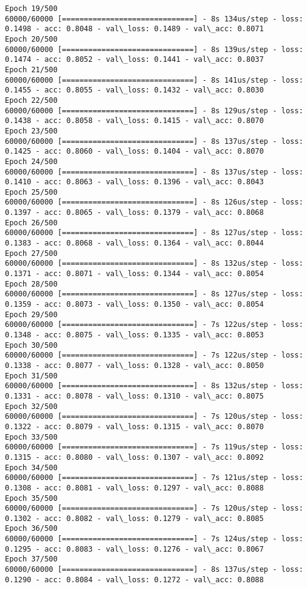 \documentclass[11pt]{article}
\begin{document}
\begin{Verbatim}[commandchars=\\\{\}]
Epoch 19/500
60000/60000 [==============================] - 8s 134us/step - loss: 0.1498 - acc: 0.8048 - val\_loss: 0.1489 - val\_acc: 0.8071
Epoch 20/500
60000/60000 [==============================] - 8s 139us/step - loss: 0.1474 - acc: 0.8052 - val\_loss: 0.1441 - val\_acc: 0.8037
Epoch 21/500
60000/60000 [==============================] - 8s 141us/step - loss: 0.1455 - acc: 0.8055 - val\_loss: 0.1432 - val\_acc: 0.8030
Epoch 22/500
60000/60000 [==============================] - 8s 129us/step - loss: 0.1438 - acc: 0.8058 - val\_loss: 0.1415 - val\_acc: 0.8070
Epoch 23/500
60000/60000 [==============================] - 8s 137us/step - loss: 0.1425 - acc: 0.8060 - val\_loss: 0.1404 - val\_acc: 0.8070
Epoch 24/500
60000/60000 [==============================] - 8s 137us/step - loss: 0.1410 - acc: 0.8063 - val\_loss: 0.1396 - val\_acc: 0.8043
Epoch 25/500
60000/60000 [==============================] - 8s 126us/step - loss: 0.1397 - acc: 0.8065 - val\_loss: 0.1379 - val\_acc: 0.8068
Epoch 26/500
60000/60000 [==============================] - 8s 127us/step - loss: 0.1383 - acc: 0.8068 - val\_loss: 0.1364 - val\_acc: 0.8044
Epoch 27/500
60000/60000 [==============================] - 8s 132us/step - loss: 0.1371 - acc: 0.8071 - val\_loss: 0.1344 - val\_acc: 0.8054
Epoch 28/500
60000/60000 [==============================] - 8s 127us/step - loss: 0.1359 - acc: 0.8073 - val\_loss: 0.1350 - val\_acc: 0.8054
Epoch 29/500
60000/60000 [==============================] - 7s 122us/step - loss: 0.1348 - acc: 0.8075 - val\_loss: 0.1335 - val\_acc: 0.8053
Epoch 30/500
60000/60000 [==============================] - 7s 122us/step - loss: 0.1338 - acc: 0.8077 - val\_loss: 0.1328 - val\_acc: 0.8050
Epoch 31/500
60000/60000 [==============================] - 8s 132us/step - loss: 0.1331 - acc: 0.8078 - val\_loss: 0.1310 - val\_acc: 0.8075
Epoch 32/500
60000/60000 [==============================] - 7s 120us/step - loss: 0.1322 - acc: 0.8079 - val\_loss: 0.1315 - val\_acc: 0.8070
Epoch 33/500
60000/60000 [==============================] - 7s 119us/step - loss: 0.1315 - acc: 0.8080 - val\_loss: 0.1307 - val\_acc: 0.8092
Epoch 34/500
60000/60000 [==============================] - 7s 121us/step - loss: 0.1308 - acc: 0.8081 - val\_loss: 0.1297 - val\_acc: 0.8088
Epoch 35/500
60000/60000 [==============================] - 7s 120us/step - loss: 0.1302 - acc: 0.8082 - val\_loss: 0.1279 - val\_acc: 0.8085
Epoch 36/500
60000/60000 [==============================] - 7s 124us/step - loss: 0.1295 - acc: 0.8083 - val\_loss: 0.1276 - val\_acc: 0.8067
Epoch 37/500
60000/60000 [==============================] - 8s 137us/step - loss: 0.1290 - acc: 0.8084 - val\_loss: 0.1272 - val\_acc: 0.8088

\end{Verbatim}
\end{document}
